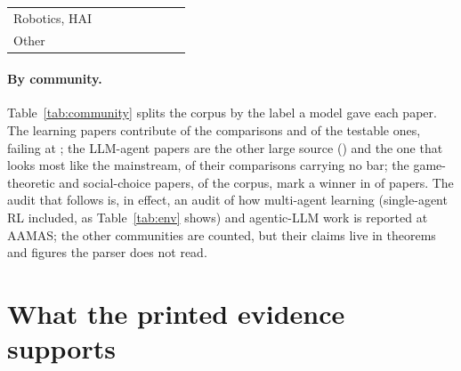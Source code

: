 \documentclass[sigconf,anonymous]{aamas}
\begin{document}
\begin{table}[t]
\begin{tabular}{@{}lrrrrrrr@{}}
Robotics, HAI & \nCRoboticsHaiPapers{} & \nCRoboticsHaiClaimPapers{} & \nCRoboticsHaiPapersErr{} & \nCRoboticsHaiNeither{} & \nCRoboticsHaiTestable{} & \nCRoboticsHaiTestablePapers{} & \nCRoboticsHaiFail{} \\
Other & \nCOtherPapers{} & \nCOtherClaimPapers{} & \nCOtherPapersErr{} & \nCOtherNeither{} & \nCOtherTestable{} & \nCOtherTestablePapers{} & \nCOtherFail{} \\
\bottomrule
\end{tabular}
\end{table}

\paragraph{By community.} Table~\ref{tab:community} splits the corpus by the
label a model gave each paper. The learning papers contribute
\nCLearningComparisons{} of the \nAComparisons{} comparisons and
\nCLearningNTestable{} of the \nANTestable{} testable ones, failing at
\nCLearningFail{}; the LLM-agent papers are the other large source
(\nCLlmAgentsComparisons{}) and the one that looks most like the
mainstream, \nCLlmAgentsNeither{} of their comparisons carrying no bar;
the game-theoretic and social-choice papers, \nCGameTheorySocialChoicePapers{}
of the corpus, mark a winner in \nCGameTheorySocialChoiceClaimPapers{}
of papers. The audit that follows is, in effect, an audit of how
multi-agent learning (single-agent RL included, as Table~\ref{tab:env}
shows) and agentic-LLM work is reported at AAMAS; the other communities
are counted, but their claims live in theorems and figures the parser
does not read.

\section{What the printed evidence supports}
\label{sec:support}
\end{document}
